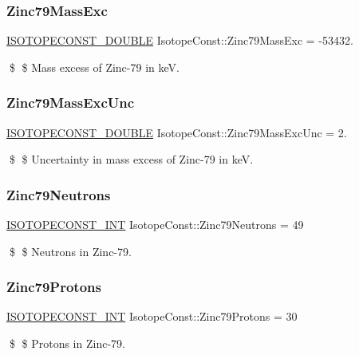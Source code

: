 \subsubsection{\texorpdfstring{Zinc79\+Mass\+Exc}{Zinc79MassExc}}
{\footnotesize\ttfamily \mbox{\hyperlink{group___isotope_const-_macros_ga8f45a7272ce02c0b4c65c44636ed719a}{I\+S\+O\+T\+O\+P\+E\+C\+O\+N\+S\+T\+\_\+\+D\+O\+U\+B\+LE}} Isotope\+Const\+::\+Zinc79\+Mass\+Exc = -\/53432.}

\$ \$ Mass excess of Zinc-\/79 in keV. \mbox{\label{group___isotope_const-_zinc-_zn79_gad851a6e324627ad526f889f76e079904}} 
\subsubsection{\texorpdfstring{Zinc79\+Mass\+Exc\+Unc}{Zinc79MassExcUnc}}
{\footnotesize\ttfamily \mbox{\hyperlink{group___isotope_const-_macros_ga8f45a7272ce02c0b4c65c44636ed719a}{I\+S\+O\+T\+O\+P\+E\+C\+O\+N\+S\+T\+\_\+\+D\+O\+U\+B\+LE}} Isotope\+Const\+::\+Zinc79\+Mass\+Exc\+Unc = 2.}

\$ \$ Uncertainty in mass excess of Zinc-\/79 in keV. \mbox{\label{group___isotope_const-_zinc-_zn79_ga44571aa1445eb24075deee6eedef46b2}} 
\subsubsection{\texorpdfstring{Zinc79\+Neutrons}{Zinc79Neutrons}}
{\footnotesize\ttfamily \mbox{\hyperlink{group___isotope_const-_macros_ga5f18360b3e99483a35c32d789e62621c}{I\+S\+O\+T\+O\+P\+E\+C\+O\+N\+S\+T\+\_\+\+I\+NT}} Isotope\+Const\+::\+Zinc79\+Neutrons = 49}

\$ \$ Neutrons in Zinc-\/79. \mbox{\label{group___isotope_const-_zinc-_zn79_gacbcfb3e308e37f5646d04c94c1b74ab5}} 
\subsubsection{\texorpdfstring{Zinc79\+Protons}{Zinc79Protons}}
{\footnotesize\ttfamily \mbox{\hyperlink{group___isotope_const-_macros_ga5f18360b3e99483a35c32d789e62621c}{I\+S\+O\+T\+O\+P\+E\+C\+O\+N\+S\+T\+\_\+\+I\+NT}} Isotope\+Const\+::\+Zinc79\+Protons = 30}

\$ \$ Protons in Zinc-\/79. 